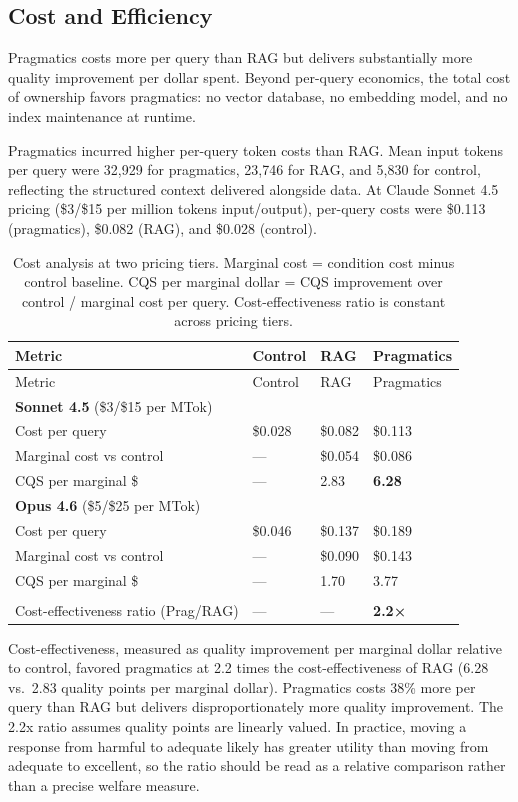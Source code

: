 \documentclass[
  11pt,
  letterpaper,
]{article}
\begin{document}
\subsection{Cost and Efficiency}\label{cost-and-efficiency}

Pragmatics costs more per query than RAG but delivers substantially more
quality improvement per dollar spent. Beyond per-query economics, the
total cost of ownership favors pragmatics: no vector database, no
embedding model, and no index maintenance at runtime.

Pragmatics incurred higher per-query token costs than RAG. Mean input
tokens per query were 32,929 for pragmatics, 23,746 for RAG, and 5,830
for control, reflecting the structured context delivered alongside data.
At Claude Sonnet 4.5 pricing (\$3/\$15 per million tokens input/output),
per-query costs were \$0.113 (pragmatics), \$0.082 (RAG), and \$0.028
(control).

\begin{longtable}[]{@{}llll@{}}
\caption{Cost analysis at two pricing tiers. Marginal cost = condition
cost minus control baseline. CQS per marginal dollar = CQS improvement
over control / marginal cost per query. Cost-effectiveness ratio is
constant across pricing tiers.}\label{tbl-cost}\tabularnewline
\toprule\noalign{}
Metric & Control & RAG & Pragmatics \\
\midrule\noalign{}
\endfirsthead
\toprule\noalign{}
Metric & Control & RAG & Pragmatics \\
\midrule\noalign{}
\endhead
\bottomrule\noalign{}
\endlastfoot
\textbf{Sonnet 4.5} (\$3/\$15 per MTok) & & & \\
Cost per query & \$0.028 & \$0.082 & \$0.113 \\
Marginal cost vs control & --- & \$0.054 & \$0.086 \\
CQS per marginal \$ & --- & 2.83 & \textbf{6.28} \\
\textbf{Opus 4.6} (\$5/\$25 per MTok) & & & \\
Cost per query & \$0.046 & \$0.137 & \$0.189 \\
Marginal cost vs control & --- & \$0.090 & \$0.143 \\
CQS per marginal \$ & --- & 1.70 & 3.77 \\
& & & \\
Cost-effectiveness ratio (Prag/RAG) & --- & --- & \textbf{2.2×} \\
\end{longtable}

Cost-effectiveness, measured as quality improvement per marginal dollar
relative to control, favored pragmatics at 2.2 times the
cost-effectiveness of RAG (6.28 vs.~2.83 quality points per marginal
dollar). Pragmatics costs 38\% more per query than RAG but delivers
disproportionately more quality improvement. The 2.2x ratio assumes
quality points are linearly valued. In practice, moving a response from
harmful to adequate likely has greater utility than moving from adequate
to excellent, so the ratio should be read as a relative comparison
rather than a precise welfare measure.
\end{document}

